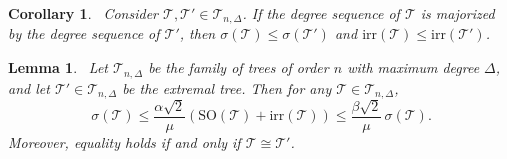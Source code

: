\documentclass[12pt, a4paper]{article}
\newtheorem{lemma}[theorem]{Lemma}
\newtheorem{corollary}[theorem]{Corollary}
\newcommand{\TT}{\mathcal{T}}
\newcommand{\irr}{\mathrm{irr}}
\begin{document}
\begin{corollary}~\label{coroSigman1llary}
Consider $\TT,\TT'\in \TT_{n,\Delta}$. If the degree sequence of $\TT$ is majorized by the degree sequence of $\TT'$, then $\sigma(\TT)\leqslant \sigma(\TT')$ and $\irr(\TT)\leqslant \irr(\TT')$.
\end{corollary}

\begin{lemma}~\label{lemSomborIn2}
Let $\mathcal{T}_{n,\Delta}$ be the family of trees of order $n$ with maximum
degree $\Delta$, and let $\TT'\in\mathcal{T}_{n,\Delta}$ be the extremal tree.
Then for any $\TT\in\mathcal{T}_{n,\Delta}$,
\begin{equation}~\label{eqq1lemSomborIn2}
\sigma(\TT)\leqslant \frac{\alpha\sqrt{2}}{\mu} (\mathrm{SO}(\TT)+\irr(\TT))\leqslant \frac{\beta\sqrt{2}}{\mu}\, \sigma(\TT).
\end{equation}
Moreover, equality holds if and only if $\TT\cong \TT'$.
\end{lemma}
\end{document}
